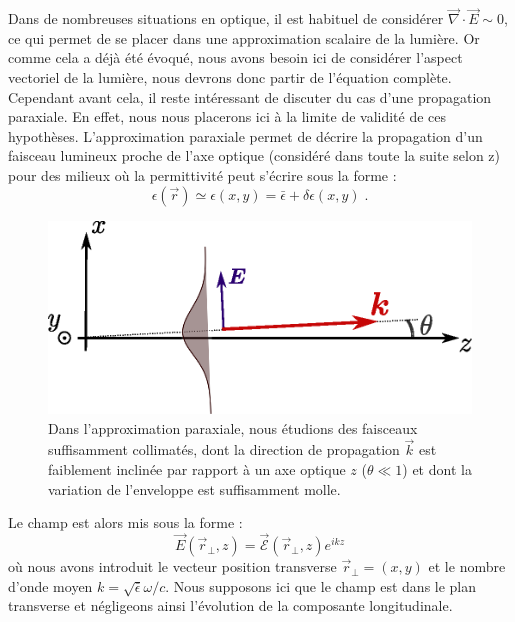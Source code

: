 \documentclass[a4paper,11pt]{article} %
\begin{document}
	Dans de nombreuses situations en optique, il est habituel de considérer $ \vec{\nabla} \cdot \vec{E} \sim 0 $, ce qui permet de se placer dans une approximation scalaire de la lumière. Or comme cela a déjà été évoqué, nous avons besoin ici de considérer l'aspect vectoriel de la lumière, nous devrons donc partir de l'équation complète. Cependant avant cela, il reste intéressant de discuter du cas d'une propagation paraxiale. En effet, nous nous placerons ici à la limite de validité de ces hypothèses. L'approximation paraxiale permet de décrire la propagation d'un faisceau lumineux proche de l'axe optique (considéré dans toute la suite selon z) pour des milieux où la permittivité peut s'écrire sous la forme :
	\begin{equation*}
		\epsilon(\vec{r}) \simeq \epsilon(x,y) = \bar{\epsilon} + \delta \epsilon(x,y) \; .
	\end{equation*}

	\begin{figure}[h]
		\centering
		\begin{minipage}[c]{0.85\linewidth}
			\centering
			\includegraphics[width=0.65\linewidth]{./Illustrations/schema_paraxial}
			\caption{Dans l'approximation paraxiale, nous étudions des faisceaux suffisamment collimatés, dont la direction de propagation $ \vec{k} $ est faiblement inclinée par rapport à un axe optique $ z $ ($ \theta \ll 1 $) et dont la variation de l'enveloppe est suffisamment molle.}
			\label{fig:schema_paraxial}
		\end{minipage}
	\end{figure}
	
	Le champ est alors mis sous la forme :
	\begin{equation*}
		\vec{E}(\vec{r}_\perp , z) = \vec{\mathcal{E}}(\vec{r}_\perp, z) e^{i k z}
	\end{equation*}
	où nous avons introduit le vecteur position transverse $ \vec{r}_\perp = (x,y) $ et le nombre d'onde moyen $ k = \sqrt{\bar{\epsilon}} \omega / c  $. Nous supposons ici que le champ est dans le plan transverse et négligeons ainsi l'évolution de la composante longitudinale.\\
	
\end{document}

